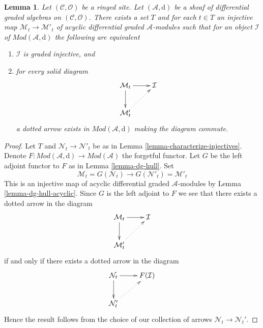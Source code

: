 \documentclass[10pt,a4paper]{amsart}
\theoremstyle{plain}
\newtheorem{lemma}[subsection]{Lemma}
\theoremstyle{definition}
\theoremstyle{remark}
\numberwithin{equation}{subsection}
\begin{document}
\begin{lemma}
\label{lemma-characterize-graded-injectives-in-dg}
Let $(\mathcal{C}, \mathcal{O})$ be a ringed site.
Let $(\mathcal{A}, \text{d})$
be a sheaf of differential graded algebras on $(\mathcal{C}, \mathcal{O})$.
There exists a set $T$ and for each $t \in T$ an injective map
$\mathcal{M}_t \to \mathcal{M}'_t$ of
acyclic differential graded $\mathcal{A}$-modules
such that for an object $\mathcal{I}$ of $\textit{Mod}(\mathcal{A}, \text{d})$
the following are equivalent
\begin{enumerate}
\item $\mathcal{I}$ is graded injective, and
\item for every solid diagram
$$
\xymatrix{
\mathcal{M}_t \ar[r] \ar[d] & \mathcal{I} \\
\mathcal{M}'_t \ar@{..>}[ru]
}
$$
a dotted arrow exists in $\textit{Mod}(\mathcal{A}, \text{d})$
making the diagram commute.
\end{enumerate}
\end{lemma}

\begin{proof}
Let $T$ and $\mathcal{N}_t \to \mathcal{N}'_t$ be as in
Lemma \ref{lemma-characterize-injectives}.
Denote $F : \textit{Mod}(\mathcal{A}, \text{d}) \to \textit{Mod}(\mathcal{A})$
the forgetful functor.
Let $G$ be the left adjoint functor to
$F$ as in Lemma \ref{lemma-dg-hull}. Set
$$
\mathcal{M}_t = G(\mathcal{N}_t) \to
G(\mathcal{N}'_t) = \mathcal{M}'_t
$$
This is an injective map of acyclic differential graded
$\mathcal{A}$-modules by Lemma \ref{lemma-dg-hull-acyclic}.
Since $G$ is the left adjoint to $F$ we see that
there exists a dotted arrow in the diagram
$$
\xymatrix{
\mathcal{M}_t \ar[r] \ar[d] & \mathcal{I} \\
\mathcal{M}'_t \ar@{..>}[ru]
}
$$
if and only if there exists a dotted arrow in the diagram
$$
\xymatrix{
\mathcal{N}_t \ar[r] \ar[d] & F(\mathcal{I}) \\
\mathcal{N}'_t \ar@{..>}[ru]
}
$$
Hence the result follows from the choice of our
collection of arrows $\mathcal{N}_t \to \mathcal{N}_t'$.
\end{proof}
\end{document}

